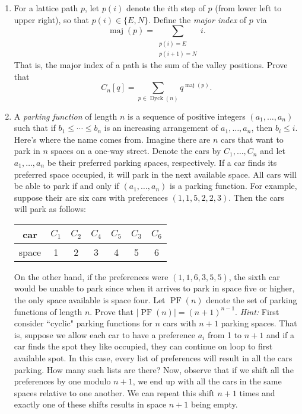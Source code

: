 \documentclass[11pt]{article}
\theoremstyle{definition}
\DeclareMathOperator{\Dyck}{Dyck}
\DeclareMathOperator{\maj}{maj}
\DeclareMathOperator{\PF}{PF}
\begin{document}
\begin{enumerate}
\item For a lattice path $p$, let $p(i)$ denote the $i$th step of $p$ (from lower left to upper right), so that $p(i)\in\{E,N\}$. Define the \emph{major index} of $p$ via
\[
\maj(p)=\sum_{\substack{p(i)=E \\ p(i+1)=N}}i.
\]
That is, the major index of a path is the sum of the valley positions.  Prove that
\[
C_n[q]=\sum_{p\in\Dyck(n)}q^{\maj(p)}.
\]

\item A \emph{parking function} of length $n$ is a sequence of positive integers $(a_1,\ldots,a_n)$ such that if $b_1\leq \cdots \leq b_n$ is an increasing arrangement of $a_1,\ldots, a_n$, then $b_i\leq i$.  Here's where the name comes from.  Imagine there are $n$ cars that want to park in $n$ spaces on a one-way street.  Denote the cars by $C_1,\ldots, C_n$ and let $a_1,\ldots,a_n$ be their preferred parking spaces, respectively. If a car finds its preferred space occupied, it will park in the next available space.  All cars will be able to park if and only if $(a_1,\ldots,a_n)$ is a parking function.  For example, suppose their are six cars with preferences $(1,1,5,2,2,3)$.  Then the cars will park as follows:
\begin{center}
\begin{tabular}{c|cccccc}
car & $C_1$ & $C_2$ & $C_4$ & $C_5$ & $C_3$ & $C_6$\\
\hline
space & 1 & 2 & 3 & 4 & 5 & 6
\end{tabular}
\end{center}

On the other hand, if the preferences were $(1,1,6,3,5,5)$, the sixth car would be unable to park since when it arrives to park in space five or higher, the only space available is space four. Let $\PF(n)$ denote the set of parking functions of length $n$.  Prove that $|\PF(n)|=(n+1)^{n-1}$. \emph{Hint:} First consider ``cyclic" parking functions for $n$ cars with $n+1$ parking spaces.  That is, suppose we allow each car to have a preference $a_i$ from 1 to $n+1$ and if a car finds the spot they like occupied, they can continue on loop to first available spot.  In this case, every list of preferences will result in all the cars parking.  How many such lists are there?  Now, observe that if we shift all the preferences by one modulo $n+1$, we end up with all the cars in the same spaces relative to one another. We can repeat this shift $n+1$ times and exactly one of these shifts results in space $n+1$ being empty.

\end{enumerate}
\end{document}
